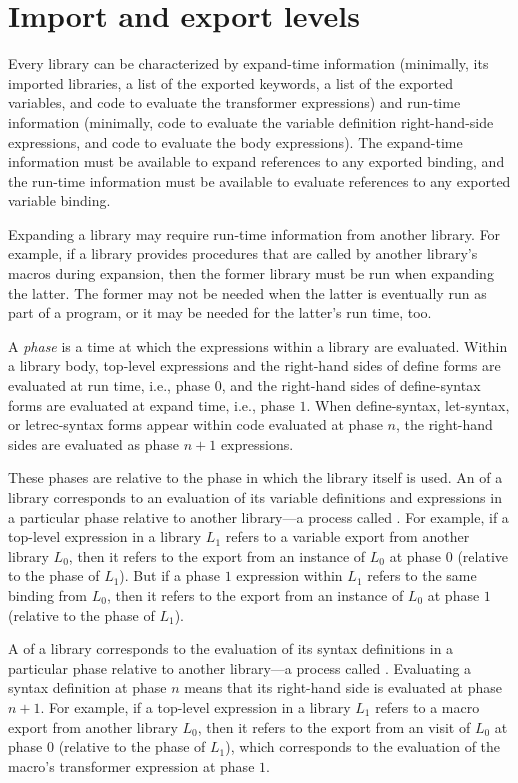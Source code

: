 \section{Import and export levels}
\label{phasessection}

Every library can be characterized by expand-time information (minimally,
its imported libraries, a list of the exported keywords, a list of the
exported variables, and code to evaluate the transformer expressions) and
run-time information (minimally, code to evaluate the variable definition
right-hand-side expressions, and code to evaluate the body expressions).
The expand-time information must be available to expand references to
any exported binding, and the run-time information must be available to
evaluate references to any exported variable binding.

Expanding a library may require run-time information from another
library. For example, if a library provides procedures that are called
by another library's macros during expansion, then the former library
must be run when expanding the latter. The former may not be needed
when the latter is eventually run as part of a program, or it may be
needed for the latter's run time, too.

%
A \emph{phase} is a time at which the expressions within a library are
evaluated.
Within a library body, top-level expressions and
the right-hand sides of {\cf define} forms are evaluated at run time,
i.e., phase $0$, and the right-hand
sides of {\cf define-syntax} forms are evaluated at expand time, i.e.,
phase $1$.
When {\cf define-syntax},
{\cf let-syntax}, or {\cf letrec-syntax}
forms appear within code evaluated at phase $n$, the right-hand sides
are evaluated as phase $n+1$ expressions.

These phases are relative to the phase in which the library itself is
used.
An  of a library corresponds to an evaluation of its
variable definitions and expressions in a particular phase relative to another
library---a process called .
For example, if a top-level expression in a library $L_1$ refers to
a variable export from another library $L_0$, then it refers to the export from an
instance of $L_0$ at phase $0$ (relative to the phase of $L_1$).
But if a phase $1$ expression within $L_1$ refers to the same binding from
$L_0$, then it refers to the export from an instance of $L_0$ at phase $1$
(relative to the phase of $L_1$).

A  of a library corresponds to the evaluation of its syntax
definitions in a particular phase relative to another
library---a process called . Evaluating a syntax definition
at phase $n$ means that its right-hand side is evaluated at phase $n+1$.
For example, if a top-level expression in a library $L_1$ refers to
a macro export from another library $L_0$, then it refers to the export from an
visit of $L_0$ at phase $0$ (relative to the phase of $L_1$), which corresponds
to the evaluation of the macro's transformer expression at phase $1$.


